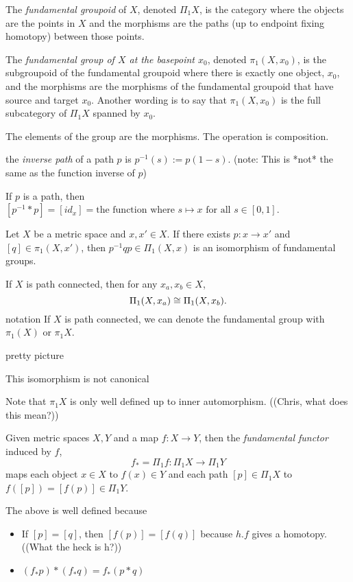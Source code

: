 \documentclass[11pt,leqno,oneside]{amsart}
\numberwithin{thm}{section}
\newcommand{\de}{\emph}
\begin{document}
\begin{defn}
  The \de{fundamental groupoid} of $X$, denoted $\Pi_1 X$, is the
  category where the objects are the points in $X$ and the morphisms
  are the paths (up to endpoint fixing homotopy) between those points.
\end{defn}
\begin{defn}
  The \de{fundamental group of $X$ at the basepoint $x_0$}, denoted
  $\pi_1(X, x_0)$, is the subgroupoid of the fundamental groupoid
  where there is exactly one object, $x_0$, and the morphisms are the
  morphisms of the fundamental groupoid that have source and target
  $x_0$.  Another wording is to say that $\pi_1(X, x_0)$ is the full
  subcategory of $\Pi_1 X$ spanned by $x_0$.

  The elements of the group are the morphisms.  The operation is
  composition.
\end{defn}
\begin{defn}
  the \de{inverse path} of a path $p$ is $p^{-1}(s) := p(1-s)$.
  (note: This is *not* the same as the function inverse of $p$)
\end{defn}
\begin{prop}
  If $p$ is a path, then
  $[p^{-1}*p] = [id_{x}] = \text{the function where $s \mapsto x$ for
    all $s \in [0,1]$}$.
\end{prop}

\begin{thm}[Hatcher 1.5]
  Let $X$ be a metric space and $x,x' \in X$.  If there exists
  $p: x \to x'$ and $[q] \in \pi_1(X,x')$, then
  $p^{-1}qp \in \Pi_1(X,x)$ is an isomorphism of fundamental groups.
\end{thm}
\begin{thm}
  If $X$ is path connected, then for any $x_a, x_b \in X$,
  $$\Pi_1(X, x_a) \mathrel{\cong} \Pi_1(X, x_b).$$
  notation If $X$ is path connected, we can denote the fundamental
  group with $\pi_1(X)$ or $\pi_1 X$.
\end{thm}
\begin{example}
  pretty picture

  This isomorphism is not canonical


  Note that $\pi_1 X$ is only well defined up to inner automorphism.
  ((Chris, what does this mean?))
\end{example}
\begin{defn}
  Given metric spaces $X, Y$ and a map $f: X \to Y$, then the
  \de{fundamental functor} induced by $f$,
  $$f_* = \Pi_1 f : \Pi_1 X \to \Pi_1 Y$$ maps each object $x \in X$
  to $f(x) \in Y$ and each path $[p] \in \Pi_1 X$ to
  $f([p]) = [f(p)] \in \Pi_1 Y$.
\end{defn}
\begin{prop}
  The above is well defined because
  \begin{itemize}
  \item If $[p]=[q]$, then $[f(p)] = [f(q)]$ because $h.f$ gives a
    homotopy.  ((What the heck is h?))
  \item $(f_*p)*(f_*q) = f_*(p*q)$
  \end{itemize}
\end{prop}
\end{document}
